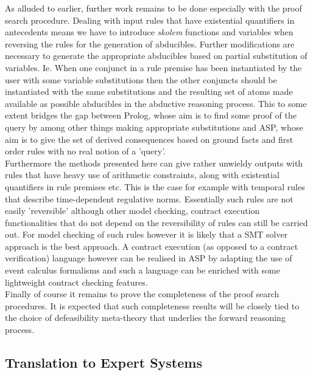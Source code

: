 As alluded to earlier, further work remains to be done especially with the proof search procedure. Dealing with input rules that have existential quantifiers in antecedents means we have to introduce \emph{skolem} functions and variables when reversing the rules for the generation of abducibles. Further modifications are necessary to generate the appropriate abducibles based on partial substitution of variables. Ie. When one conjunct in a rule premise has been instantiated by the user with some variable substitutions then the other conjuncts should be instantiated with the same substitutions and the resulting set of atoms made available as possible abducibles in the  abductive reasoning process. This to some extent bridges the gap between Prolog, whose aim is to find some proof of the query by among other things making appropriate substitutions and ASP, whose aim is to give the set of derived consequences based on ground facts and first order rules with no real notion of a 'query'.\\
Furthermore the methods presented here can give rather unwieldy outputs with rules that have heavy use of arithmetic constraints, along with existential quantifiers in rule premises etc. This is the case for example with temporal rules that describe time-dependent regulative norms. Essentially such rules are not easily 'reversible' although other model checking, contract execution functionalities that do not depend on the reversibility of rules can still be carried out. For model checking of such rules however it is likely that a SMT solver approach is the best approach. A contract execution (as opposed to a contract verification) language however can be realised in ASP by adapting the use of event calculus formalisms and such a language can be enriched with some lightweight contract checking features.\\
Finally of course it remains to prove the completeness of the proof search procedures. It is expected that such completeness results will be closely tied to the choice of defeasibility meta-theory that underlies the forward reasoning process.
\subsection{Translation to Expert Systems}\label{sec:translation_expertsystem}


